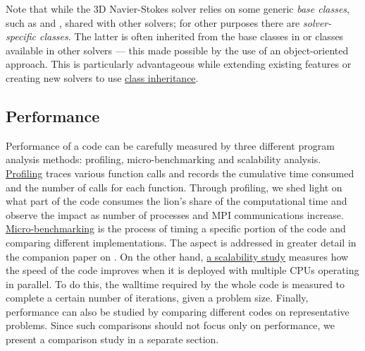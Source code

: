 Note that while the 3D Navier-Stokes solver relies on some generic \emph{base
classes}, such as  and
, shared with other solvers; for other
purposes there are \emph{solver-specific classes}.  The latter is often inherited
from the base classes in  or classes available in other
solvers --- this made possible by the use of an object-oriented approach.  This is
particularly advantageous while extending existing features or creating new
solvers to use
\href{https://docs.python.org/3/tutorial/classes.html#inheritance}{%
class inheritance}.



\subsection{Performance}

%
%

Performance of a code can be carefully measured by three different program
analysis methods: profiling, micro-benchmarking and scalability analysis.
%
\href{https://en.wikipedia.org/wiki/Profiling_(computer_programming)}{Profiling}
traces various function calls and records the cumulative time consumed and the
number of calls for each function.  Through profiling, we shed light on what
part of the code consumes the lion's share of the computational time and
observe the impact as number of processes and MPI communications increase.
%
\href{https://en.wiktionary.org/wiki/microbenchmark}{Micro-benchmarking} is the
process of timing a specific portion of the code and comparing different
implementations.  The aspect is addressed in greater detail in the companion
paper on  \citep{fluidfft}.
%
On the other hand,
\href{https://en.wikipedia.org/wiki/Scalability#Performance_tuning_versus_hardware_scalability}{a
scalability study} measures how the speed of the code improves when it is deployed
with multiple CPUs operating in parallel.  To do this, the walltime required by
the whole code is measured to complete a certain number of iterations, given a
problem size.
%
Finally, performance can also be studied by comparing different codes on
representative problems. Since such comparisons should not focus only on
performance, we present a comparison study in a separate section.

